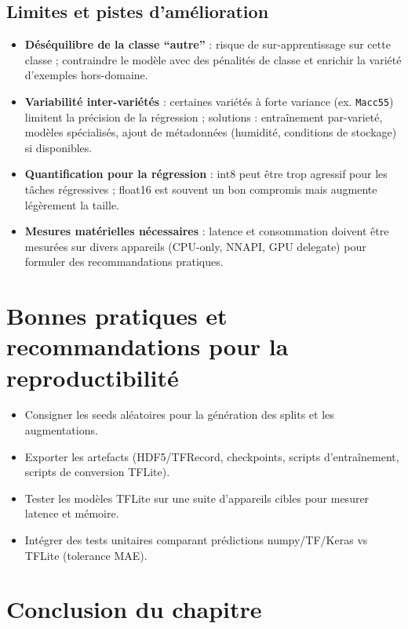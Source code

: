 \subsection{Limites et pistes d'amélioration}
\begin{itemize}
    \item \textbf{Déséquilibre de la classe ``autre''} : risque de sur-apprentissage sur cette classe ; contraindre le modèle avec des pénalités de classe et enrichir la variété d'exemples hors-domaine.
    \item \textbf{Variabilité inter-variétés} : certaines variétés à forte variance (ex. \texttt{Macc55}) limitent la précision de la régression ; solutions : entraînement par-varieté, modèles spécialisés, ajout de métadonnées (humidité, conditions de stockage) si disponibles.
    \item \textbf{Quantification pour la régression} : int8 peut être trop agressif pour les tâches régressives ; float16 est souvent un bon compromis mais augmente légèrement la taille.
    \item \textbf{Mesures matérielles nécessaires} : latence et consommation doivent être mesurées sur divers appareils (CPU-only, NNAPI, GPU delegate) pour formuler des recommandations pratiques.
\end{itemize}

\section{Bonnes pratiques et recommandations pour la reproductibilité}

\begin{itemize}
    \item Consigner les seeds aléatoires pour la génération des splits et les augmentations.
    \item Exporter les artefacts (HDF5/TFRecord, checkpoints, scripts d'entraînement, scripts de conversion TFLite).
    \item Tester les modèles TFLite sur une suite d'appareils cibles pour mesurer latence et mémoire.
    \item Intégrer des tests unitaires comparant prédictions numpy/TF/Keras vs TFLite (tolerance MAE).
\end{itemize}

\section{Conclusion du chapitre}


